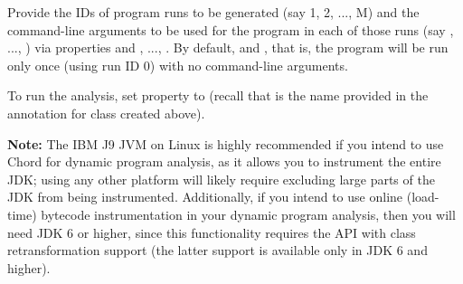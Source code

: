 Provide the IDs of program runs to be generated (say 1, 2, ..., M) and the command-line arguments to be
used for the program in each of those runs (say , ..., ) via properties
 and , ..., .
By default,  and , that is, the program will be run only
once (using run ID 0) with no command-line arguments.

To run the analysis, set property  to 
(recall that  is the name provided in the  annotation for class
 created above).

{\bf Note:} The IBM J9 JVM on Linux is highly recommended if you intend to use Chord for
dynamic program analysis, as it allows you to instrument the entire JDK; using any other
platform will likely require excluding large parts of the JDK from being instrumented.
Additionally, if you intend to use online (load-time) bytecode instrumentation in
your dynamic program analysis, then you will need JDK 6 or higher, since this functionality
requires the  API with class retransformation support (the latter
support is available only in JDK 6 and higher).

